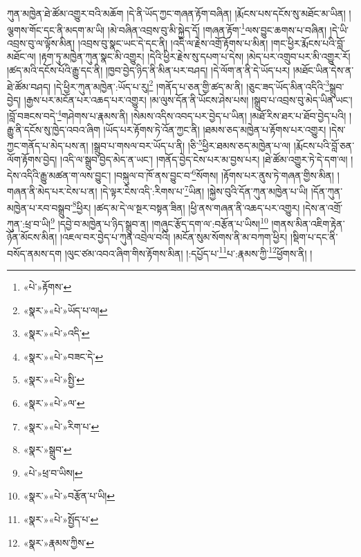 ཀུན་མཁྱེན་ཐེ་ཚོམ་འགྱུར་བའི་མཆོག །དེ་ནི་ཡོད་ཀྱང་གཞན་རྟོག་བཞིན། །རྨོངས་པས་དངོས་སུ་མཐོང་མ་ཡིན། །ལྕགས་གོང་དང་ནི་མདག་མ་ཡི། །མེ་བཞིན་འབྲས་བུ་མི་སྐྱེད་དོ། །གཞན་རྟོག་\footnote{«པེ་»རྟོགས་}ལས་བྱུང་ཆགས་པ་བཞིན། །དེ་ཡི་འབྲས་བུ་ལ་ལྟོས་མིན། །འབྲས་བུ་སྣང་ཡང་དེ་དང་ནི། །འདི་ལ་རྗེས་འགྲོ་རྟོགས་པ་མིན། །གང་ཕྱིར་རྨོངས་པའི་བློ་མཐོང་ལ། །རྟག་ཏུ་མཁྱེན་ཀུན་སྣང་མི་འགྱུར། །དེའི་ཕྱིར་རྗེས་སུ་དཔག་པ་དེས། །མེད་པར་འགྲུབ་པར་མི་འགྱུར་རོ། །ཚད་མའི་དངོས་པོའི་རྒྱུ་དང་ནི། །ཁྱབ་བྱེད་ཉིད་ནི་མིན་པར་བཤད། །དེ་ལོག་ན་ནི་དེ་ཡོད་པར། །མཐོང་ཡིན་དེས་ན་ཐེ་ཚོམ་བཤད། །དེ་ཕྱིར་ཀུན་མཁྱེན་:ཡོད་པ་རུ།\footnote{«སྣར་»«པེ་»ཡོད་པ་ལ།} །གནོད་པ་ཅན་གྱི་ཚད་མ་ནི། །ཅུང་ཟད་ཡོད་མིན་འདིའི་\footnote{«སྣར་»«པེ་»འདི་}སྒྲུབ་བྱེད། །རྒྱས་པར་མངོན་པར་འཆད་པར་འགྱུར། །མ་ལུས་དོན་ནི་ཡོངས་ཤེས་པས། །སྒྲུབ་པ་འབྲས་བུ་མེད་ཡིན་ཡང་། །བློ་བཟངས་བདེ་\footnote{«སྣར་»«པེ་»བཟང་དེ་}གཤེགས་པ་རྣམས་ནི། །སེམས་འདིས་འབད་པར་བྱེད་པ་ཡིན། །མཐོ་རིས་ཐར་པ་ཐོབ་བྱེད་པའི། །རྒྱུ་ནི་དངོས་སུ་ཁྱེད་འབའ་ཞིག །ཡོད་པར་རྟོགས་ཏེ་འོན་ཀྱང་ནི། །ཐམས་ཅད་མཁྱེན་པ་རྟོགས་པར་འགྱུར། །དེས་ཀྱང་གནོད་པ་མེད་པས་ན། །སྒྲུབ་པ་གསལ་བར་ཡོད་པ་ནི། །ཅི་\footnote{«སྣར་»«པེ་»སྤྱི་}ཕྱིར་ཐམས་ཅད་མཁྱེན་པ་ལ། །རྨོངས་པའི་བློ་ཅན་ལོག་རྟོགས་བྱེད། །འདི་ལ་སྒྲུབ་བྱེད་མེད་ན་ཡང་། །གནོད་བྱེད་ངེས་པར་མ་བྱས་པར། །ཐེ་ཚོམ་འགྱུར་ཏེ་དེ་དག་ལ། །དེས་འདིའི་རྒྱུ་མཚན་ག་ལས་བྱུང་། །བསྐུལ་བ་ཁོ་ནས་བྱུང་བ་\footnote{«སྣར་»«པེ་»ལ་}སོགས། །རྟོགས་པར་ནུས་ཏེ་གཞན་གྱིས་མིན། །གཞན་ནི་མེད་པར་ངེས་པ་ན། །དེ་ལྟར་ངེས་འདི་:རིགས་པ་\footnote{«སྣར་»«པེ་»རིག་པ་}ཡིན། །སྐྱེས་བུའི་དོན་ཀུན་མཁྱེན་པ་ཡི། །དོན་ཀུན་མཁྱེན་པ་རབ་བསྒྲུབ་\footnote{«སྣར་»སྒྲུབ་}ཕྱིར། །ཚད་མ་དེ་ལ་སྔར་བསྟན་ཟིན། །ཕྱི་ནས་གཞན་ནི་འཆད་པར་འགྱུར། །དེས་ན་འགྲོ་ཀུན་:ཕྲ་བ་ཡི།\footnote{«པེ་»ཕྲ་བ་ཡིས།} །དབྱེ་བ་མཁྱེན་པ་ཉིད་སྒྲུབ་ན། །གཞུང་རྩོད་དག་ལ་:བརྩོན་པ་ཡིས།\footnote{«སྣར་»«པེ་»བརྩོན་པ་ཡི།} །གནས་མིན་འཇིག་རྟེན་ཉོན་མོངས་མིན། །འཇལ་བར་བྱེད་པ་ཀུན་འབྲེལ་བའི། །མངོན་སུམ་སོགས་ནི་མ་བཀག་ཕྱིར། །སྡིག་པ་དང་ནི་བསོད་ནམས་དག །ལུང་ཙམ་འབའ་ཞིག་གིས་རྟོགས་མིན། །:དཔྱོད་པ་\footnote{«སྣར་»«པེ་»སྤྱོད་པ་}པ་:རྣམས་ཀྱི་\footnote{«སྣར་»རྣམས་ཀྱིས་}ཕྱོགས་ནི། །

